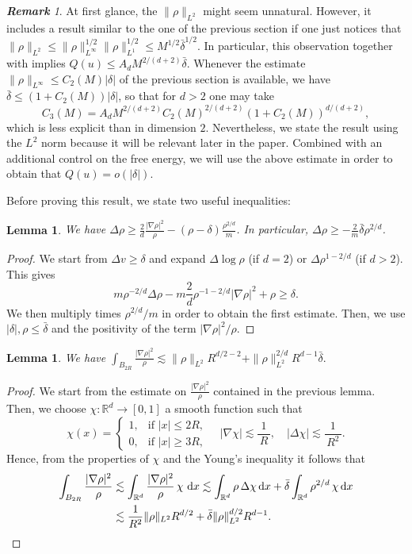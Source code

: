 \documentclass[11pt,a4paper]{article}
\numberwithin{equation}{section}
\newcommand{\R}{{\mathbb{R}}}
\theoremstyle{plain}
\newtheorem{lemma}[theorem]{Lemma}
\theoremstyle{remark}
\newtheorem{remark}[theorem]{\bf Remark}
\newcommand {\f}{\frac}
\newcommand{\diff}{\mathop{}\!\mathrm{d}}
\begin{document}
\begin{remark}
At first glance, the $\|\rho\|_{L^2}$ might seem unnatural. However, it includes a result similar to the one of the previous section if one just notices that $\|\rho\|_{L^2}\leq \|\rho\|_{L^\infty}^{1/2}\|\rho\|_{L^1}^{1/2}\leq M^{1/2}\bar\delta^{1/2}$. In particular, this observation together with  implies $Q(u)\leq A_d M^{2/(d+2)}\bar\delta$. Whenever the estimate $\|\rho\|_{L^\infty}\leq C_2(M)|\delta|$ of the previous section is available, we have $\bar\delta\leq(1+C_2(M))|\delta|$, so that for $d>2$ one may take
$$
C_3(M) = A_d M^{2/(d+2)}C_2(M)^{2/(d+2)}(1+C_2(M))^{d/(d+2)},
$$
which is less explicit than in dimension $2$. Nevertheless, we state the result using the $L^2$ norm because it will be relevant later in the paper. Combined with an additional control on the free energy, we will use the above estimate in order to obtain that $Q(u)= o(|\delta|)$.
\end{remark}
Before proving this result, we state two useful inequalities:
\begin{lemma}\label{lemma estimate laplacian}
 We have  $\Delta\rho\geq \f{2}{d}\f{|\nabla\rho|^2}{\rho}-(\rho-\delta)\f{\rho^{2/d}}{m}$. In particular, 
$\Delta\rho\geq -\f{2}{m}\bar\delta \rho^{2/d}$.
\end{lemma}
\begin{proof}
We start from $\Delta v\ge \delta$ and expand $\Delta\log\rho$ (if $d=2$) or $\Delta\rho^{1-2/d}$ (if $d>2$).
This gives
$$m\rho^{-2/d}\Delta\rho-m\frac{2}{d}\rho^{-1-2/d}|\nabla\rho|^2+\rho\geq\delta.$$
We then multiply times $\rho^{2/d}/m$ in order to obtain the first estimate. Then, we use $|\delta|,\rho\leq\bar\delta$ and the positivity of the term $|\nabla\rho|^2/\rho$.
\end{proof}
\begin{lemma}\label{lemma local fischer}
 We have  $
\int_{B_{2R}}\f{|\nabla \rho|^2}{\rho}\lesssim \|\rho\|_{L^{2}} R^{d/2-2} + \|\rho\|_{L^{2}}^{2/d} R^{d-1}\bar\delta.
$
\end{lemma}
\begin{proof}
    
We start from the estimate on $\f{|\nabla\rho|^2}{\rho}$ contained in the previous lemma. Then, we choose $\chi:\R^{d}\to [0,1]$ a smooth function such that
\[
\chi(x)  = 
\begin{cases}
1, & \text{if } |x|\le 2R,\\
0, & \text{if }|x|\ge 3R,
\end{cases}
\quad
|\nabla\chi| \lesssim \f{1}{\,R\,},
\quad
|\Delta\chi| \lesssim \f{1}{\,R^2\,}.
\]
Hence, from the properties of $\chi$ and the Young's inequality it follows that
\begin{align*}
\int_{B_{2R}}\f{|\nabla \rho|^2}{\rho}&\lesssim \int_{\R^d}\f{|\nabla\rho|^2}{\rho}\, \chi\, \diff x \lesssim \int_{\R^d} \rho\, \Delta\chi\diff x + \bar\delta \int_{\R^d} \rho^{2/d}\, \chi\diff x\\
& \lesssim \f{1}{R^2} \|\rho\|_{L^2} R^{d/2} + \bar\delta\|\rho\|_{L^2}^{d/2} R^{d-1}. \qedhere
\end{align*}
\end{proof}
\end{document}
